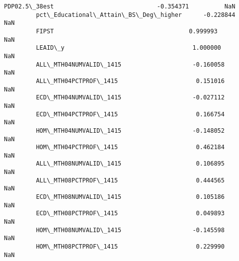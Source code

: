 \documentclass[11pt]{article}
\begin{document}
\begin{Verbatim}[commandchars=\\\{\}]
         PDP02.5\_38est                             -0.354371          NaN   
         pct\_Educational\_Attain\_BS\_Deg\_higher      -0.228844          NaN   
         FIPST                                      0.999993          NaN   
         LEAID\_y                                    1.000000          NaN   
         ALL\_MTH04NUMVALID\_1415                    -0.160058          NaN   
         ALL\_MTH04PCTPROF\_1415                      0.151016          NaN   
         ECD\_MTH04NUMVALID\_1415                    -0.027112          NaN   
         ECD\_MTH04PCTPROF\_1415                      0.166754          NaN   
         HOM\_MTH04NUMVALID\_1415                    -0.148052          NaN   
         HOM\_MTH04PCTPROF\_1415                      0.462184          NaN   
         ALL\_MTH08NUMVALID\_1415                     0.106895          NaN   
         ALL\_MTH08PCTPROF\_1415                      0.444565          NaN   
         ECD\_MTH08NUMVALID\_1415                     0.105186          NaN   
         ECD\_MTH08PCTPROF\_1415                      0.049893          NaN   
         HOM\_MTH08NUMVALID\_1415                    -0.145598          NaN   
         HOM\_MTH08PCTPROF\_1415                      0.229990          NaN   
         

\end{Verbatim}
\end{document}
